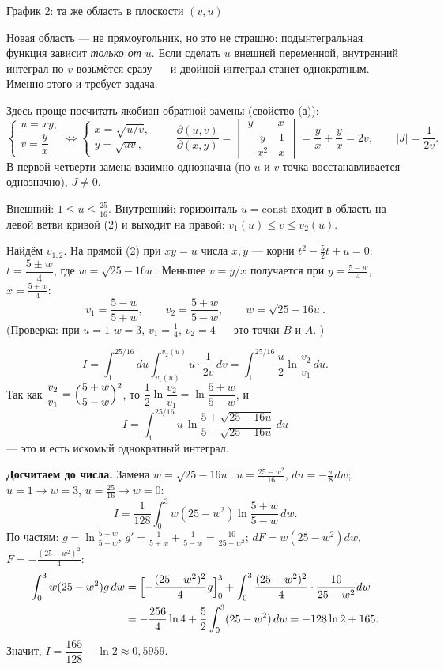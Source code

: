 \begin{center}
\begin{minipage}[t]{0.49\linewidth}
\small График 2: та же область в плоскости $(v,u)$
\end{minipage}
\end{center}
Новая область --- не прямоугольник, но это не страшно: подынтегральная функция зависит \emph{только от $u$}. Если сделать $u$ внешней переменной, внутренний интеграл по $v$ возьмётся сразу --- и двойной интеграл станет однократным. Именно этого и требует задача.

Здесь проще посчитать якобиан обратной замены (свойство (а)):
\[
\begin{cases}u=xy,\\ v=\dfrac yx\end{cases}\iff
\begin{cases}x=\sqrt{u/v},\\ y=\sqrt{uv},\end{cases}
\qquad
\frac{\partial(u,v)}{\partial(x,y)}=\begin{vmatrix}y&x\\ -\dfrac{y}{x^2}&\dfrac1x\end{vmatrix}=\frac yx+\frac yx=2v,
\qquad |J|=\frac{1}{2v}.
\]
В первой четверти замена взаимно однозначна (по $u$ и $v$ точка восстанавливается однозначно), $J\ne0$.

Внешний: $1\leqslant u\leqslant\frac{25}{16}$. Внутренний: горизонталь $u=\mathrm{const}$ входит в область на левой ветви кривой (2) и выходит на правой: $v_1(u)\leqslant v\leqslant v_2(u)$.

Найдём $v_{1,2}$. На прямой (2) при $xy=u$ числа $x,y$ --- корни $t^2-\frac52t+u=0$:
$t=\dfrac{5\pm w}{4}$, где $w=\sqrt{25-16u}$. Меньшее $v=y/x$ получается при $y=\frac{5-w}{4}$, $x=\frac{5+w}{4}$:
\[
v_1=\frac{5-w}{5+w},\qquad v_2=\frac{5+w}{5-w},\qquad w=\sqrt{25-16u}.
\]
(Проверка: при $u=1$ $w=3$, $v_1=\frac14$, $v_2=4$ --- это точки $B$ и $A$. \checkmark)

\[
I=\int_1^{25/16}du\int_{v_1(u)}^{v_2(u)}u\cdot\frac{1}{2v}\,dv=\int_1^{25/16}\frac u2\ln\frac{v_2}{v_1}\,du .
\]
Так как $\dfrac{v_2}{v_1}=\Bigl(\dfrac{5+w}{5-w}\Bigr)^2$, то $\dfrac12\ln\dfrac{v_2}{v_1}=\ln\dfrac{5+w}{5-w}$, и
\[
\boxed{\ I=\int_1^{25/16}u\,\ln\frac{5+\sqrt{25-16u}}{5-\sqrt{25-16u}}\,du\ }
\]
--- это и есть искомый однократный интеграл.

\textbf{Досчитаем до числа.} Замена $w=\sqrt{25-16u}$: $u=\frac{25-w^2}{16}$, $du=-\frac w8dw$; $u=1\to w=3$, $u=\frac{25}{16}\to w=0$:
\[
I=\frac1{128}\int_0^3 w(25-w^2)\ln\frac{5+w}{5-w}\,dw .
\]
По частям: $g=\ln\frac{5+w}{5-w}$, $g'=\frac1{5+w}+\frac1{5-w}=\frac{10}{25-w^2}$; $dF=w(25-w^2)dw$, $F=-\frac{(25-w^2)^2}{4}$:
\[
\begin{aligned}\int_0^3 w(25-w^2)g\,dw&=\Bigl[-\frac{(25-w^2)^2}{4}g\Bigr]_0^3+\int_0^3\frac{(25-w^2)^2}{4}\cdot\frac{10}{25-w^2}dw\\
&=-\frac{256}{4}\ln4+\frac52\int_0^3(25-w^2)\,dw=-128\ln2+165 .\end{aligned}
\]
Значит, $I=\dfrac{165}{128}-\ln2\approx0{,}5959$.

